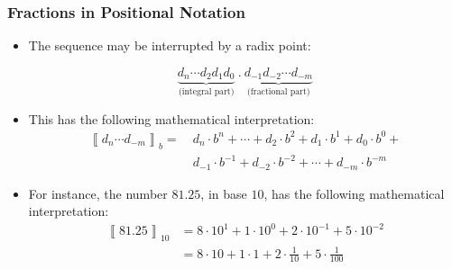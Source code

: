 \begin{frame}

\frametitle{Fractions in Positional Notation}

\begin{itemize}

\item The sequence may be interrupted by a radix point:

\[
\underbrace{d_n \cdots d_2 d_1 d_0}_{\text{(integral
part)}}~.~\underbrace{d_{-1} d_{-2} \cdots d_{-m}}_{\text{(fractional part)}}
\]

\item This has the following mathematical interpretation:\begin{align*}
\left\llbracket d_n \cdots d_{-m} \right\rrbracket_b =&~d_n \cdot b^n + \cdots
+ d_2 \cdot b^2 + d_1 \cdot b^1 + d_0 \cdot b^0 +\\
&~d_{-1} \cdot b^{-1} + d_{-2} \cdot b^{-2} + \cdots + d_{-m} \cdot b^{-m}
\end{align*}

\item For instance, the number $81.25$, in base $10$, has the following
mathematical interpretation:\begin{align*}
\left\llbracket 81.25 \right\rrbracket_{10} &=
8 \cdot 10^1 + 1 \cdot 10^0 + 2 \cdot 10^{-1} + 5 \cdot 10^{-2} \\
&= 8\cdot 10 + 1 \cdot 1 + 2 \cdot \frac{1}{10} + 5 \cdot \frac{1}{100}
\end{align*}

\end{itemize}

\end{frame}


